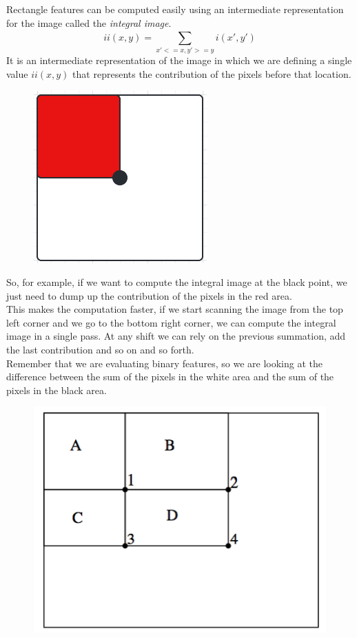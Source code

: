 Rectangle features can be computed easily using an intermediate representation for the image called the \textit{integral image}.
\[ii(x,y)=\sum_{x'<=x, y'>=y}^{}i(x', y')\]
It is an intermediate representation of the image in which we are defining a single value $ii(x,y)$ that represents the contribution of the pixels before that location.
\begin{figure}
    \includegraphics[width=0.5\linewidth]{Figures/IntegralImage.png}
\end{figure}
So, for example, if we want to compute the integral image at the black point, we just need to dump up the contribution of the pixels in the red area.
\\This makes the computation faster, if we start scanning the image from the top left corner and we go to the bottom right corner, we can compute the integral image in a single pass.
At any shift we can rely on the previous summation, add the last contribution and so on and so forth.
\\Remember that we are evaluating binary features, so we are looking at the difference between the sum of the pixels in the white area and the sum of the pixels in the black area.
\begin{figure}[h]
    \centering
    \includegraphics[scale=0.4]{Figures/IntegralImage2.png}
\end{figure}
